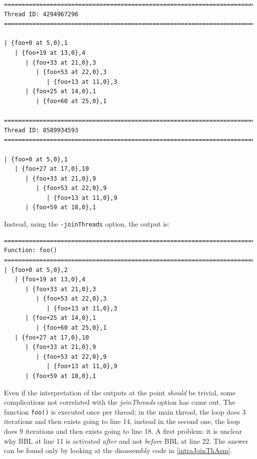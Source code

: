 \documentclass[a4paper,10pt]{report}
\begin{document}
\begin{lstlisting}[label=out11, caption={the output of IHPP analyzing \texttt{prog5}}]
=============================================================================
Thread ID: 4294967296
=============================================================================

| {foo+0 at 5,0},1
   | {foo+19 at 13,0},4
      | {foo+33 at 21,0},3
         | {foo+53 at 22,0},3
            | {foo+13 at 11,0},3
      | {foo+25 at 14,0},1
         | {foo+60 at 25,0},1

=============================================================================
Thread ID: 8589934593
=============================================================================

| {foo+0 at 5,0},1
   | {foo+27 at 17,0},10
      | {foo+33 at 21,0},9
         | {foo+53 at 22,0},9
            | {foo+13 at 11,0},9
      | {foo+59 at 18,0},1

\end{lstlisting}

\noindent
Instead, using the \verb|-joinThreads| option, the output is:

\begin{lstlisting}[label=out12, 
caption={the output of IHPP analyzing \texttt{prog5} with \texttt{-joinThreads}}]
=============================================================================
Function: foo()
=============================================================================
| {foo+0 at 5,0},2
   | {foo+19 at 13,0},4
      | {foo+33 at 21,0},3
         | {foo+53 at 22,0},3
            | {foo+13 at 11,0},3
      | {foo+25 at 14,0},1
         | {foo+60 at 25,0},1
   | {foo+27 at 17,0},10
      | {foo+33 at 21,0},9
         | {foo+53 at 22,0},9
            | {foo+13 at 11,0},9
      | {foo+59 at 18,0},1

\end{lstlisting}

\noindent
Even if the interpretation of the outputs at the point \emph{should} be trivial,
some complications not correlated with the \emph{joinThreads} option 
has came out.
The function \verb|foo()| is executed once per thread; in the main thread, the loop does 3 iterations and then exists going to line 14, instead
in the second one, the loop does 9 iterations and then exists going to line 18.
A first problem: it is unclear why BBL at line 11 is activated \emph{after} 
and not \emph{before} BBL at line 22. The answer can be found only by looking at
the disassembly code in \cref{intraJoinThAsm}.
\end{document}
